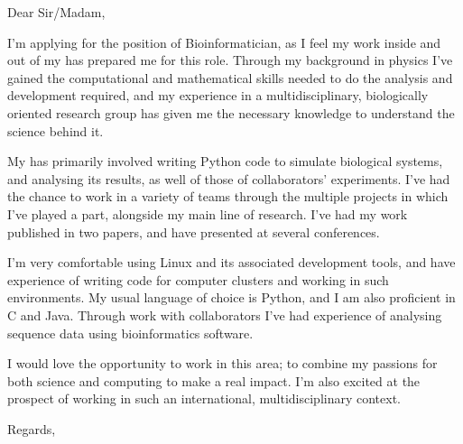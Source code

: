 \documentclass[10pt]{letter}
\begin{document}
    \begin{letter}{}

        Dear Sir/Madam,

        I'm applying for the position of Bioinformatician, as I feel my work inside and out of my  has prepared me for this role. Through my background in physics I've gained the computational and mathematical skills needed to do the analysis and development required, and my experience in a multidisciplinary, biologically oriented research group has given me the necessary knowledge to understand the science behind it.

        My  has primarily involved writing Python code to simulate biological systems, and analysing its results, as well of those of collaborators' experiments. I've had the chance to work in a variety of teams through the multiple projects in which I've played a part, alongside my main line of research. I've had my work published in two papers, and have presented at several conferences.

        I'm very comfortable using Linux and its associated development tools, and have experience of writing code for computer clusters and working in such environments. My usual language of choice is Python, and I am also proficient in C and Java. Through work with collaborators I've had experience of analysing sequence data using bioinformatics software.

        I would love the opportunity to work in this area; to combine my passions for both science and computing to make a real impact. I'm also excited at the prospect of working in such an international, multidisciplinary context.

        \closing{Regards,}

    \end{letter}        
\end{document}
